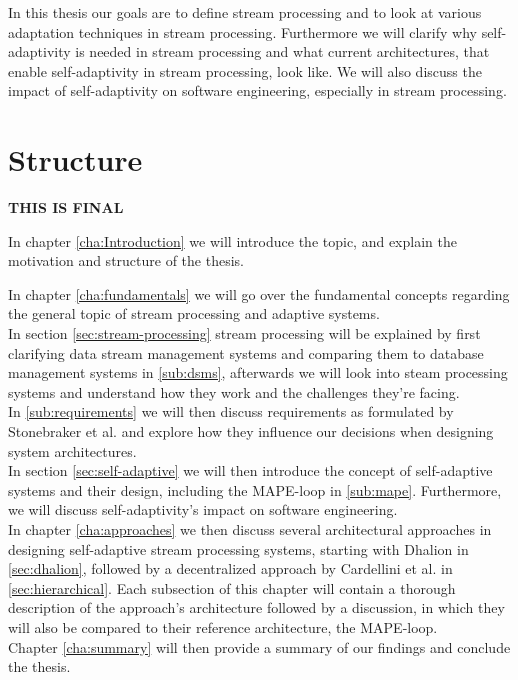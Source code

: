 \quad In this thesis our goals are to define stream processing and to look at various adaptation techniques in stream processing. Furthermore we will clarify why
self-adaptivity is needed in stream processing and what current architectures, that enable self-adaptivity in stream processing, look like.
We will also discuss the impact of self-adaptivity on software engineering, especially in stream processing.


\section{Structure}
\label{sec:structure}
\textbf{\color{green}THIS IS FINAL}

In chapter \ref{cha:Introduction} we will introduce the topic, and explain the motivation and structure of the thesis.

In chapter \ref{cha:fundamentals} we will go over the fundamental concepts regarding the general topic of stream processing and adaptive systems.
\\
In section \ref{sec:stream-processing} stream processing will be explained by first clarifying data stream management systems and comparing them to database management systems 
in \ref{sub:dsms}, afterwards we will look into steam processing systems and understand how they work and the challenges they're facing.
\\
In \ref{sub:requirements} we will then discuss requirements as formulated by Stonebraker et al. and explore how they influence our decisions when designing system architectures.
\\
In section \ref{sec:self-adaptive} we will then introduce the concept of self-adaptive systems and their design, including the MAPE-loop in \ref{sub:mape}. 
Furthermore, we will discuss self-adaptivity's impact on software engineering.
\\
In chapter \ref{cha:approaches} we then discuss several architectural approaches in designing self-adaptive stream processing systems, starting with Dhalion in \ref{sec:dhalion}, 
followed by a decentralized approach by Cardellini et al. in \ref{sec:hierarchical}.
Each subsection of this chapter will contain a thorough description of the approach's architecture followed by a discussion, 
in which they will also be compared to their reference architecture, the MAPE-loop.
\\
Chapter \ref{cha:summary} will then provide a summary of our findings and conclude the thesis.